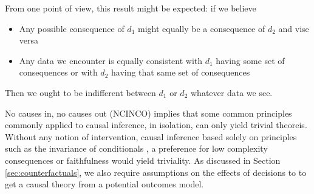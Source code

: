 From one point of view, this result might be expected: if we believe
\begin{itemize}
\item Any possible consequence of $d_1$ might equally be a consequence of $d_2$ and vise versa
\item Any data we encounter is equally consistent with $d_1$ having some set of consequences or with $d_2$ having that same set of consequences
\end{itemize}
Then we ought to be indifferent between $d_1$ or $d_2$ whatever data we see.

No causes in, no causes out (NCINCO) implies that some common principles commonly applied to causal inference, in isolation, can only yield trivial theoreis. Without any notion of intervention, causal inference based solely on principles such as the invariance of conditionals \citet{arjovsky_invariant_2019,peters_causal_2016}, a preference for low complexity consequences \citet{lemeire_replacing_2013} or faithfulness \citet{spirtes_causation_1993} would yield triviality. As discussed in Section \ref{sec:counterfactuals}, we also require assumptions on the effects of decisions to to get a causal theory from a potential outcomes model.